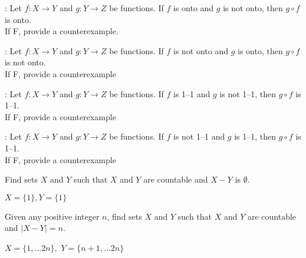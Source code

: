 \nextq
\tf:
Let $f : X \rightarrow Y$ and $g: Y \rightarrow Z$ be functions.
If $f$ is onto and $g$ is not onto, then $g \circ f$ is onto.
\dotfill\answerbox{}
\\
If F, provide a counterexample.
\begin{answerlong}

\end{answerlong}

\nextq
\tf:
Let $f : X \rightarrow Y$ and $g: Y \rightarrow Z$ be functions.
If $f$ is not onto and $g$ is onto, then $g \circ f$ is not onto.
\dotfill\answerbox{}
\\
If F, provide a counterexample
\begin{answerlong}

\end{answerlong}

\nextq
\tf:
Let $f : X \rightarrow Y$ and $g: Y \rightarrow Z$ be functions.
If $f$ is 1--1 and $g$ is not 1--1, then $g \circ f$ is 1--1.
\dotfill\answerbox{}
\\
If F, provide a counterexample
\begin{answerlong}

\end{answerlong}

\nextq
\tf:
Let $f : X \rightarrow Y$ and $g: Y \rightarrow Z$ be functions.
If $f$ is not 1--1 and $g$ is 1--1, then $g \circ f$ is 1--1.
\dotfill\answerbox{}
\\
If F, provide a counterexample
\begin{answerlong}

\end{answerlong}

\nextq
Find sets $X$ and $Y$ such that 
$X$ and $Y$ are countable and $X - Y$ is $\emptyset$.
\begin{answerlong}
    $X = \{1\}, Y = \{1\}$
\end{answerlong}

\nextq
Given any positive integer $n$,
find sets $X$ and $Y$ such that 
$X$ and $Y$ are countable and $|X - Y| = n$.
\begin{answerlong}
$X = \{1,...2n\},$
$Y = \{n+1,...2n\}$
\end{answerlong}

